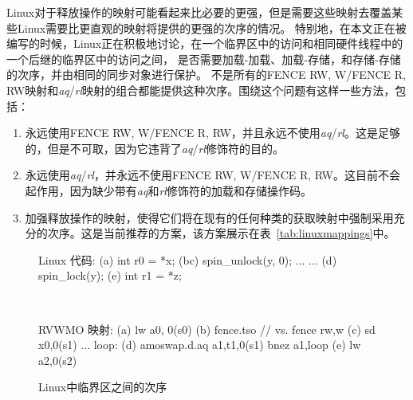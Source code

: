 Linux对于释放操作的映射可能看起来比必要的更强，但是需要这些映射去覆盖某些Linux需要比更直观的映射将提供的更强的次序的情况。
特别地，在本文正在被编写的时候，Linux正在积极地讨论，在一个临界区中的访问和相同硬件线程中的一个后继的临界区中的访问之间，
是否需要加载-加载、加载-存储，和存储-存储的次序，并由相同的同步对象进行保护。
不是所有的FENCE RW, W/FENCE R, RW映射和{\em aq}/{\em rl}映射的组合都能提供这种次序。围绕这个问题有这样一些方法，包括：
\begin{enumerate}
  \item 永远使用FENCE RW, W/FENCE R, RW，并且永远不使用{\em aq}/{\em rl}。这是足够的，但是不可取，因为它违背了{\em aq}/{\em rl}修饰符的目的。
  \item 永远使用{\em aq}/{\em rl}，并永远不使用FENCE RW, W/FENCE R, RW。这目前不会起作用，因为缺少带有{\em aq}和{\em rl}修饰符的加载和存储操作码。
  \item 加强释放操作的映射，使得它们将在现有的任何种类的获取映射中强制采用充分的次序。这是当前推荐的方案，该方案展示在表~\ref{tab:linuxmappings}中。
\end{enumerate}

\begin{figure}[h!]
  \centering\small
  \begin{verbbox}
Linux 代码:
(a)  int r0 = *x;
(bc) spin_unlock(y, 0);
     ...
     ...
(d)  spin_lock(y);
(e)  int r1 = *z;
  \end{verbbox}
  \theverbbox
  ~~~~~~~~~~
  \begin{verbbox}
RVWMO 映射:
(a) lw           a0, 0(s0)
(b) fence.tso  // vs. fence rw,w
(c) sd           x0,0(s1)
    ...
    loop:
(d) amoswap.d.aq a1,t1,0(s1)
    bnez         a1,loop
(e) lw           a2,0(s2)
  \end{verbbox}
  \theverbbox
  \caption{Linux中临界区之间的次序}
  \label{fig:litmus:lkmm_ll}
\end{figure}

